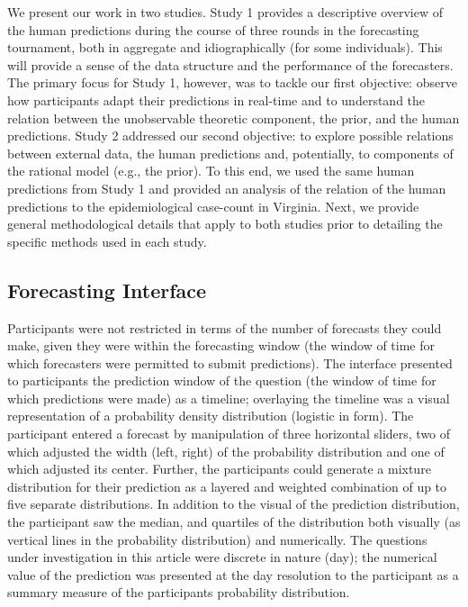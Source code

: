 We present our work in two studies.  Study 1 provides a descriptive overview of the human predictions during the course of three rounds in the forecasting tournament, both in aggregate and idiographically (for some individuals).  This will provide a sense of the data structure and the performance of the forecasters.  The primary focus for Study 1, however, was to tackle our first objective: observe how participants adapt their predictions in real-time and to understand the relation between the unobservable theoretic component, the prior, and the human predictions.  Study 2 addressed our second objective: to explore possible relations between external data, the human predictions and, potentially, to components of the rational model (e.g., the prior).  To this end, we used the same human predictions from Study 1 and provided an analysis of the relation of the human predictions to the epidemiological case-count in Virginia. Next, we provide general methodological details that apply to both studies prior to detailing the specific methods used in each study.

\subsection{Forecasting Interface}\label{interface}
Participants were not restricted in terms of the number of forecasts they could make, given they were within the forecasting window (the window of time for which forecasters were permitted to submit predictions).  The interface presented to participants the prediction window of the question (the window of time for which predictions were made) as a timeline; overlaying the timeline was a visual representation of a probability density distribution (logistic in form).  The participant entered a forecast by manipulation of three horizontal sliders, two of which adjusted the width (left, right) of the probability distribution and one of which adjusted its center.  Further, the participants could generate a mixture distribution for their prediction as a layered and weighted combination of up to five separate distributions.  
In addition to the visual of the prediction distribution, the participant saw the median, and quartiles of the distribution both visually (as vertical lines in the probability distribution) and numerically.  The questions under investigation in this article were discrete in nature (day); the numerical value of the prediction was presented at the day resolution to the participant as a summary measure of the participants probability distribution.  

